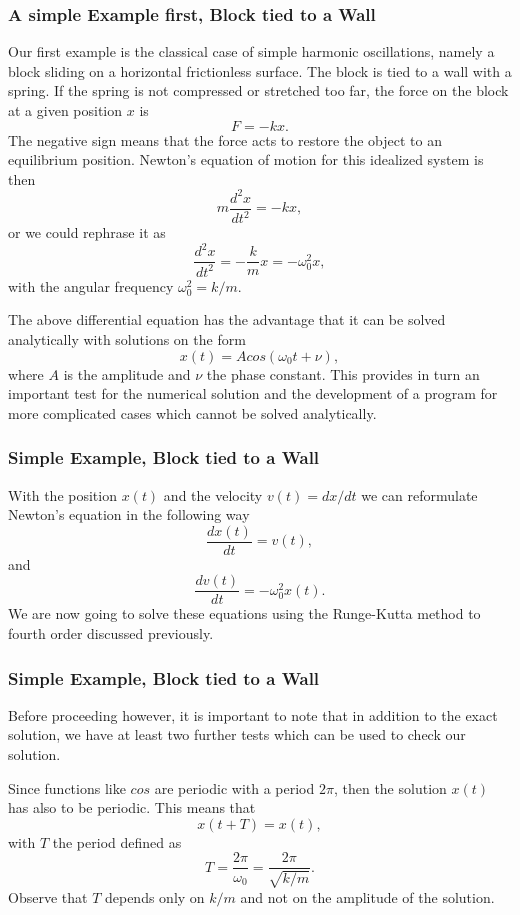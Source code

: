 \documentclass{beamer}
\begin{document}
\begin{frame}
\frametitle{A simple Example first, Block tied to a Wall}

\begin{block}{}
Our first example is the classical case of simple harmonic oscillations, namely a block sliding on a horizontal frictionless surface. The block is tied to a wall with a spring. If the spring is not compressed or stretched too far, the force on the block at a given position $x$ is 
  \[
      F=-kx.
  \]
The negative sign means that the force acts to restore the object to an equilibrium position. Newton's equation of motion for this idealized system is then 
  \[
    m\frac{d^2x}{dt^2}=-kx,
  \]
or we could rephrase it as
  \[
   \frac{d^2x}{dt^2}=-\frac{k}{m}x=-\omega_0^2x,
    \label{eq:newton1}
  \]
with the angular frequency $\omega_0^2=k/m$. 

The above differential equation has the advantage that it can be solved  analytically with solutions on the form
  \[
     x(t)=Acos(\omega_0t+\nu),
  \]
where $A$ is the amplitude and $\nu$ the phase constant.   This provides in turn an important test for the numerical
solution and the development of a program for more complicated cases which cannot be solved analytically. 
\end{block}
\end{frame}

\begin{frame}
\frametitle{Simple Example, Block tied to a Wall}

\begin{block}{}
With the position $x(t)$ and the velocity  $v(t)=dx/dt$ we can reformulate Newton's equation in the following way
  \[
      \frac{dx(t)}{dt}=v(t),
  \]
  and
  \[
      \frac{dv(t)}{dt}=-\omega_0^2x(t).
  \]
  We are now going to solve these equations using the Runge-Kutta method
  to fourth order discussed previously. 
\end{block}
\end{frame}

\begin{frame}
\frametitle{Simple Example, Block tied to a Wall}

\begin{block}{}
Before proceeding however, it is important to note that in addition to the exact solution, we have at least two further tests which can be used to check our solution. 

Since functions like $cos$ are periodic with a period $2\pi$, then the solution $x(t)$ has also to be periodic. This means that
\[
     x(t+T)=x(t),
\]
with $T$ the period defined as 
\[
     T=\frac{2\pi}{\omega_0}=\frac{2\pi}{\sqrt{k/m}}.
\]
Observe that $T$ depends only on $k/m$ and not on the amplitude of the solution. 
\end{block}
\end{frame}
\end{document}
